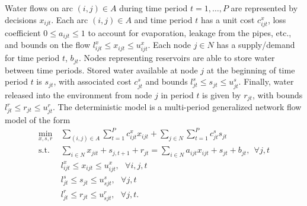 \documentclass[12pt]{amsart}
\newcommand{\st}{\mbox{s.t.}}
\begin{document}
Water flows on arc $(i,j) \in A$ during time period $t = 1, \dots, P$ are represented by decisions $x_{ijt}$.
Each arc $(i,j) \in A$ and time period $t$ has a unit cost $c_{ijt}^x$, loss coefficient $0 \leq a_{ijt} \leq 1$ to account for evaporation, leakage from the pipes, etc., and bounds on the flow $l_{ijt}^x \leq x_{ijt} \leq u_{ijt}^x$.
Each node $j \in N$ has a supply/demand for time period $t$, $b_{jt}$.
Nodes representing reservoirs are able to store water between time periods.
Stored water available at node $j$ at the beginning of time period $t$ is $s_{jt}$, with associated cost $c_{jt}^s$ and bounds $l_{jt}^s \leq s_{jt} \leq u_{jt}^s$.
Finally, water released into the environment from node $j$ in period $t$ is given by $r_{jt}$, with bounds $l_{jt}^r \leq r_{jt} \leq u_{jt}^r$.
The deterministic model is a multi-period generalized network flow model of the form
\begin{align*}
	\min_{x,s,r} \ & \sum_{(i,j) \in A} \sum_{t=1}^P c_{ijt}^x x_{ijt} + \sum_{j \in N} \sum_{t=1}^P c_{jt}^s s_{jt}\\
	\st \ & \sum_{i \in N} x_{jit} + s_{j,t+1} + r_{jt} = \sum_{i \in N} a_{ijt} x_{ijt} + s_{jt} + b_{jt}, \ \ \forall j,t \\
	& l_{ijt}^x \leq x_{ijt} \leq u_{ijt}^x,\ \ \ \forall i,j,t \\
	& l_{jt}^s \leq s_{jt} \leq u_{sjt}^s, \ \ \ \forall j,t \\
	& l_{jt}^r \leq r_{jt} \leq u_{sjt}^r, \ \ \ \forall j,t.
\end{align*}
\end{document}
